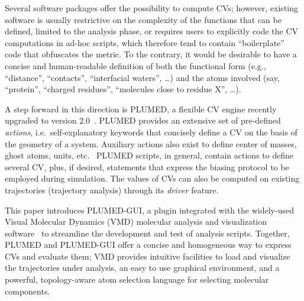 \documentclass[preprint,review,11pt]{elsarticle}
\begin{document}
Several software packages offer the possibility to compute CVs;
however, existing software is usually restrictive on the complexity of
the functions that can be defined, limited to the analysis phase, or
requires users to explicitly code the CV computations in ad-hoc
scripts, which therefore tend to contain ``boilerplate'' code that
obfuscates the metric. To the contrary, it would be desirable to have
a concise and human-readable definition of both the functional form
(e.g., ``distance'', ``contacts'', ``interfacial waters'', \dots) and
 the atoms involved (say, ``protein'', ``charged residues'',
``molecules close to residue X'', \dots).

A step forward in this direction is PLUMED, a flexible CV engine
recently upgraded to version 2.0~\cite{tribello_plumed_2013}. PLUMED provides
an extensive set of pre-defined \emph{actions}, i.e.\ self-explanatory
keywords that concisely define a CV on the basis of the geometry of a
system. Auxiliary actions also exist to define center of masses, ghost
atoms, units, etc.~\cite{plumed_manual,bonomi_plumed:_2009}
PLUMED scripts, in general, contain actions to define several CV,
plus, if desired, statements that express the biasing protocol to be
employed during simulation. The values of CVs can also
be computed on existing trajectories (trajectory analysis) through
its \emph{driver}  feature.

This paper introduces PLUMED-GUI, a plugin integrated with the
widely-used Visual Molecular Dynamics (VMD) molecular analysis and
visualization software~\cite{Humphrey_Dalke_Schulten_1996} to
streamline the development and test of analysis scripts.  Together,
PLUMED and PLUMED-GUI offer a concise and homogeneous way to express
CVs and evaluate them; VMD provides intuitive facilities to load and
visualize the trajectories under analysis, an easy to use graphical
environment, and a powerful, topology-aware atom selection language
for selecting molecular components.







\end{document}
